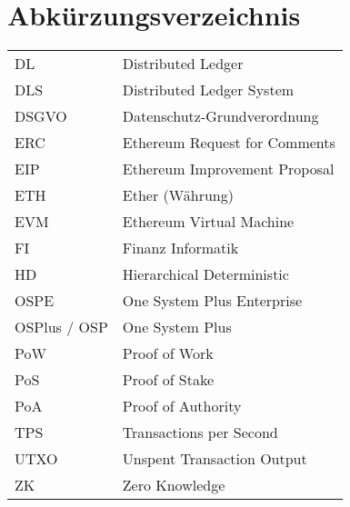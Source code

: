 
\section{Abkürzungsverzeichnis}

\begin{longtable}{p{6 cm}p{9 cm}}
    DL & Distributed Ledger \\
    DLS & Distributed Ledger System \\
    DSGVO & Datenschutz-Grundverordnung \\
    ERC & Ethereum Request for Comments \\
    EIP & Ethereum Improvement Proposal \\
    ETH & Ether (Währung) \\
    EVM & Ethereum Virtual Machine \\
    FI & Finanz Informatik \\
    HD & Hierarchical Deterministic \\
    OSPE & One System Plus Enterprise \\
    OSPlus / OSP & One System Plus \\
    PoW & Proof of Work \\
    PoS & Proof of Stake \\
    PoA & Proof of Authority \\
    TPS & Transactions per Second \\
    UTXO & Unspent Transaction Output \\
    ZK & Zero Knowledge \\
\end{longtable}


